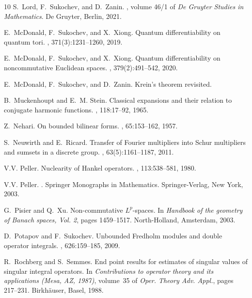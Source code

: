 \documentclass[12pt]{amsart}
\begin{document}
\begin{thebibliography}{10}
S.~Lord, F.~Sukochev, and D.~Zanin.
, volume 46/1 of
  {\em De Gruyter Studies in Mathematics}.
\newblock De Gruyter, Berlin, 2021.

E.~McDonald, F.~Sukochev, and X.~Xiong.
\newblock Quantum differentiability on quantum tori.
, 371(3):1231--1260, 2019.

E.~McDonald, F.~Sukochev, and X.~Xiong.
\newblock Quantum differentiability on noncommutative {E}uclidean spaces.
, 379(2):491--542, 2020.

E.~McDonald, F.~Sukochev, and D.~Zanin.
\newblock Krein's theorem revisited.

B.~Muckenhoupt and E.~M. Stein.
\newblock Classical expansions and their relation to conjugate harmonic
  functions.
, 118:17--92, 1965.

Z.~Nehari.
\newblock On bounded bilinear forms.
, 65:153--162, 1957.

S.~Neuwirth and E.~Ricard.
\newblock Transfer of {F}ourier multipliers into {S}chur multipliers and
  sumsets in a discrete group.
, 63(5):1161--1187, 2011.

V.V. Peller.
\newblock Nuclearity of {\color{blue}Hankel} operators.
, 113:538--581, 1980.

V.V. Peller.
.
\newblock Springer Monographs in Mathematics. Springer-Verlag, New York, 2003.

G.~Pisier and Q.~Xu.
\newblock Non-commutative {$L^p$}-spaces.
\newblock In {\em Handbook of the geometry of {B}anach spaces, {V}ol. 2}, pages
  1459--1517. North-Holland, Amsterdam, 2003.

D.~Potapov and F.~Sukochev.
\newblock Unbounded {F}redholm modules and double operator integrals.
, 626:159--185, 2009.

R.~Rochberg and S.~Semmes.
\newblock End point results for estimates of singular values of singular
  integral operators.
\newblock In {\em Contributions to operator theory and its applications
  ({M}esa, {AZ}, 1987)}, volume~35 of {\em Oper. Theory Adv. Appl.}, pages
  217--231. Birkh\"{a}user, Basel, 1988.


\end{thebibliography}
\end{document}

